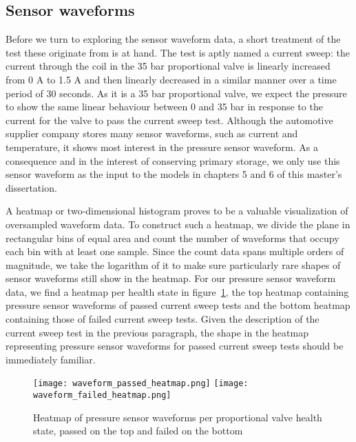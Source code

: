 \subsection{Sensor waveforms}

Before we turn to exploring the sensor waveform data, a short treatment of the test these originate from is at hand.
The test is aptly named a current sweep: the current through the coil in the 35 bar proportional valve is linearly increased from 0 A to 1.5 A and then linearly decreased in a similar manner over a time period of 30 seconds.
As it is a 35 bar proportional valve, we expect the pressure to show the same linear behaviour between 0 and 35 bar in response to the current for the valve to pass the current sweep test.
Although the automotive supplier company stores many sensor waveforms, such as current and temperature, it shows most interest in the pressure sensor waveform.
As a consequence and in the interest of conserving primary storage, we only use this sensor waveform as the input to the models in chapters 5 and 6 of this master's dissertation.

A heatmap or two-dimensional histogram proves to be a valuable visualization of oversampled waveform data.
To construct such a heatmap, we divide the plane in rectangular bins of equal area and count the number of waveforms that occupy each bin with at least one sample.
Since the count data spans multiple orders of magnitude, we take the logarithm of it to make sure particularly rare shapes of sensor waveforms still show in the heatmap.
For our pressure sensor waveform data, we find a heatmap per health state in figure~\ref{fig:waveform-heatmaps}, the top heatmap containing pressure sensor waveforms of passed current sweep tests and the bottom heatmap containing those of failed current sweep tests.
Given the description of the current sweep test in the previous paragraph, the shape in the heatmap representing pressure sensor waveforms for passed current sweep tests should be immediately familiar.

\begin{figure}
  \texttt{[image: waveform\_passed\_heatmap.png]}
  \texttt{[image: waveform\_failed\_heatmap.png]}
  \caption{Heatmap of pressure sensor waveforms per proportional valve health state, passed on the top and failed on the bottom}
  \label{fig:waveform-heatmaps}
\end{figure}

